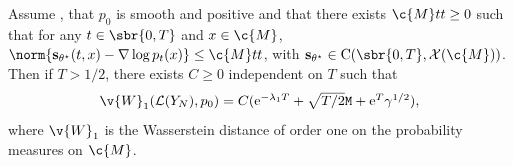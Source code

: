 \begin{theorem}
	\label{thm:weak_qualitative_appendix}
	Assume , that $p_0$ is smooth and positive and that there exists $\c{M}tt \geq 0$ such that for any $t \in \sbr{0,T}$ and $x \in \c{M}$, $\norm{\mathbf{s}_{\theta^{\star}}(t,x) - \nabla \log p_{t}(x)} \leq \c{M}tt$, with $\mathbf{s}_{\theta^\star} \in \mathrm{C}(\sbr{0,T}, \mathcal{X}(\c{M}))$.
	Then if $T > 1/2$, there exists $C \geq 0$ independent on $T$ such that \begin{equation} \textstyle{ \v{W}_1(\mathcal{L}(Y_N), p_0) = C ( \mathrm{e}^{-\lambda_1 T} + \sqrt{T/2} \mathtt{M} + \mathrm{e}^T \gamma^{1/2}) , } \end{equation} where $\v{W}_1$ is the Wasserstein distance of order one on the probability measures on $\c{M}$.
\end{theorem}

